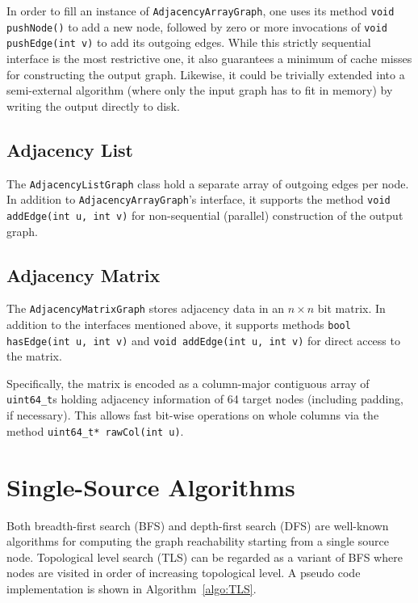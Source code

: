 \documentclass[12pt,a4paper,twoside]{article}
\begin{document}
In order to fill an instance of \verb|AdjacencyArrayGraph|, one uses its method \verb|void pushNode()| to add a new node, followed by zero or more invocations of \verb|void pushEdge(int v)| to add its outgoing edges. While this strictly sequential interface is the most restrictive one, it also guarantees a minimum of cache misses for constructing the output graph. Likewise, it could be trivially extended into a semi-external algorithm (where only the input graph has to fit in memory) by writing the output directly to disk.

\subsection{Adjacency List}

The \verb|AdjacencyListGraph| class hold a separate array of outgoing edges per node. In addition to \verb|AdjacencyArrayGraph|'s interface, it supports the method \verb|void addEdge(int u, int v)| for non-sequential (\eg parallel) construction of the output graph.

\subsection{Adjacency Matrix}

The \verb|AdjacencyMatrixGraph| stores adjacency data in an $n \times n$ bit matrix. In addition to the interfaces mentioned above, it supports methods \verb|bool hasEdge(int u, int v)| and \verb|void addEdge(int u, int v)| for direct access to the matrix.

Specifically, the matrix is encoded as a column-major contiguous array of \verb|uint64_t|s holding adjacency information of 64 target nodes (including padding, if necessary). This allows fast bit-wise operations on whole columns via the method \verb|uint64_t* rawCol(int u)|.

\section{Single-Source Algorithms}

Both breadth-first search (BFS) and depth-first search (DFS) are well-known algorithms for computing the graph reachability starting from a single source node. Topological level search (TLS) can be regarded as a variant of BFS where nodes are visited in order of increasing topological level. A pseudo code implementation is shown in Algorithm~\ref{algo:TLS}.
\end{document}
